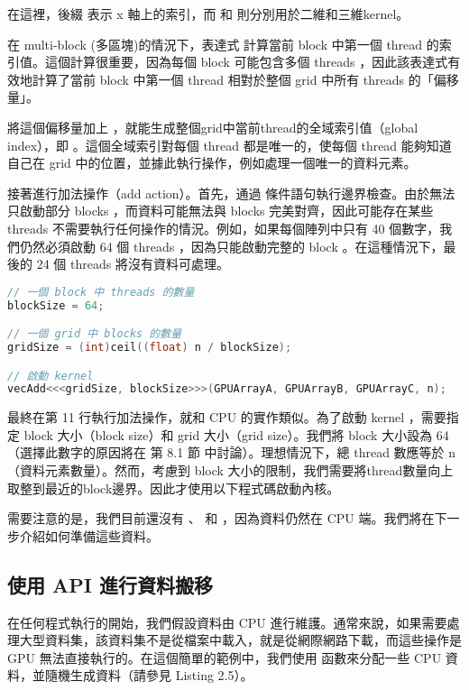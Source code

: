 在這裡，後綴  表示 x 軸上的索引，而  和  則分別用於二維和三維kernel。

在 multi-block (多區塊)的情況下，表達式  計算當前 block 中第一個 thread 的索引值。這個計算很重要，因為每個 block 可能包含多個 threads ，因此該表達式有效地計算了當前 block 中第一個 thread 相對於整個 grid 中所有 threads 的「偏移量」。

將這個偏移量加上 ，就能生成整個grid中當前thread的全域索引值（global index），即 。這個全域索引對每個 thread 都是唯一的，使每個 thread 能夠知道自己在 grid 中的位置，並據此執行操作，例如處理一個唯一的資料元素。

接著進行加法操作（add action）。首先，通過  條件語句執行邊界檢查。由於無法只啟動部分 blocks ，而資料可能無法與 blocks 完美對齊，因此可能存在某些 threads 不需要執行任何操作的情況。例如，如果每個陣列中只有 40 個數字，我們仍然必須啟動 64 個 threads ，因為只能啟動完整的 block 。在這種情況下，最後的 24 個 threads 將沒有資料可處理。

\begin{lstlisting}[language=C, caption={管理 threads 與啟動 kernel}, label={4th:example}]
// 一個 block 中 threads 的數量
blockSize = 64;

// 一個 grid 中 blocks 的數量
gridSize = (int)ceil((float) n / blockSize);

// 啟動 kernel
vecAdd<<<gridSize, blockSize>>>(GPUArrayA, GPUArrayB, GPUArrayC, n);
\end{lstlisting}

最終在第 11 行執行加法操作，就和 CPU 的實作類似。為了啟動 kernel ，需要指定 block 大小（block size）和 grid 大小（grid size）。我們將 block 大小設為 64（選擇此數字的原因將在 第 8.1 節 中討論）。理想情況下，總 thread 數應等於 n（資料元素數量）。然而，考慮到 block 大小的限制，我們需要將thread數量向上取整到最近的block邊界。因此才使用以下程式碼啟動內核。

需要注意的是，我們目前還沒有 、 和 ，因為資料仍然在 CPU 端。我們將在下一步介紹如何準備這些資料。

\subsection{使用  API 進行資料搬移}
在任何程式執行的開始，我們假設資料由 CPU 進行維護。通常來說，如果需要處理大型資料集，該資料集不是從檔案中載入，就是從網際網路下載，而這些操作是 GPU 無法直接執行的。在這個簡單的範例中，我們使用  函數來分配一些 CPU 資料，並隨機生成資料（請參見 Listing 2.5）。

